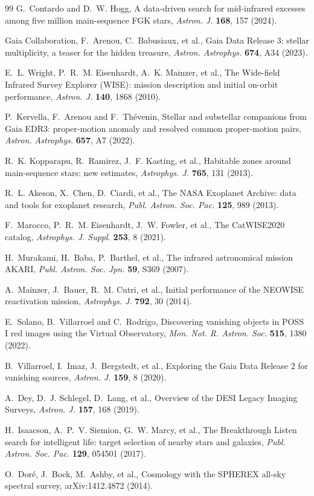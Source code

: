 \documentclass[3p,11pt]{elsarticle}
\begin{document}
\begin{thebibliography}{99}
G.~Contardo and D.~W. Hogg, A data-driven search for mid-infrared excesses among five
million main-sequence FGK stars, \emph{Astron. J.} \textbf{168}, 157 (2024).

Gaia Collaboration, F.~Arenou, C.~Babusiaux, et al., Gaia Data Release 3: stellar
multiplicity, a teaser for the hidden treasure, \emph{Astron. Astrophys.} \textbf{674},
A34 (2023).

E.~L. Wright, P.~R.~M. Eisenhardt, A.~K. Mainzer, et al., The Wide-field Infrared Survey
Explorer (WISE): mission description and initial on-orbit performance, \emph{Astron. J.}
\textbf{140}, 1868 (2010).

P.~Kervella, F.~Arenou and F.~Th\'evenin, Stellar and substellar companions from Gaia
EDR3: proper-motion anomaly and resolved common proper-motion pairs, \emph{Astron.
Astrophys.} \textbf{657}, A7 (2022).

R.~K. Kopparapu, R.~Ramirez, J.~F. Kasting, et al., Habitable zones around
main-sequence stars: new estimates, \emph{Astrophys. J.} \textbf{765}, 131 (2013).

R.~L. Akeson, X.~Chen, D.~Ciardi, et al., The NASA Exoplanet Archive: data and tools for
exoplanet research, \emph{Publ. Astron. Soc. Pac.} \textbf{125}, 989 (2013).

F.~Marocco, P.~R.~M. Eisenhardt, J.~W. Fowler, et al., The CatWISE2020 catalog,
\emph{Astrophys. J. Suppl.} \textbf{253}, 8 (2021).

H.~Murakami, H.~Baba, P.~Barthel, et al., The infrared astronomical mission AKARI,
\emph{Publ. Astron. Soc. Jpn.} \textbf{59}, S369 (2007).

A.~Mainzer, J.~Bauer, R.~M. Cutri, et al., Initial performance of the NEOWISE
reactivation mission, \emph{Astrophys. J.} \textbf{792}, 30 (2014).

E.~Solano, B.~Villarroel and C.~Rodrigo, Discovering vanishing objects in POSS I red
images using the Virtual Observatory, \emph{Mon. Not. R. Astron. Soc.} \textbf{515},
1380 (2022).

B.~Villarroel, I.~Imaz, J.~Bergstedt, et al., Exploring the Gaia Data Release 2 for
vanishing sources, \emph{Astron. J.} \textbf{159}, 8 (2020).

A.~Dey, D.~J. Schlegel, D.~Lang, et al., Overview of the DESI Legacy Imaging Surveys,
\emph{Astron. J.} \textbf{157}, 168 (2019).

H.~Isaacson, A.~P.~V. Siemion, G.~W. Marcy, et al., The Breakthrough Listen search for
intelligent life: target selection of nearby stars and galaxies, \emph{Publ. Astron.
Soc. Pac.} \textbf{129}, 054501 (2017).

O.~Dor\'e, J.~Bock, M.~Ashby, et al., Cosmology with the SPHEREX all-sky spectral
survey, arXiv:1412.4872 (2014).

\end{thebibliography}
\end{document}
